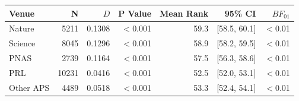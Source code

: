 \begin{tabular}{lrrrrrr}
  \toprule
Venue & N & $D$ & P Value & Mean Rank & 95\% CI & $BF_{01}$ \\ 
  \midrule
Nature & 5211 & 0.1308 & $<$0.001 & 59.3 & [58.5, 60.1] & $<$0.01 \\ 
Science & 8045 & 0.1296 & $<$0.001 & 58.9 & [58.2, 59.5] & $<$0.01 \\ 
PNAS & 2739 & 0.1164 & $<$0.001 & 57.5 & [56.3, 58.6] & $<$0.01 \\ 
PRL & 10231 & 0.0416 & $<$0.001 & 52.5 & [52.0, 53.1] & $<$0.01 \\ 
Other APS & 4489 & 0.0518 & $<$0.001 & 53.3 & [52.4, 54.1] & $<$0.01 \\ 
   \bottomrule
\end{tabular}
